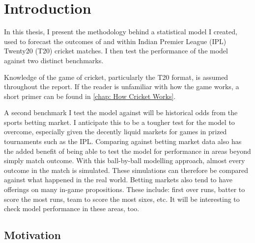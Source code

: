 \newcommand{\hsp}{\hspace{20pt}}
\titleformat{\chapter}[hang]{\Huge\bfseries}{\thechapter\hsp\textcolor{gray75}{|}\hsp}{0pt}{\Huge\bfseries}
\chapter{Introduction}


In this thesis, I present the methodology behind a statistical model I created, used to forecast the outcomes of and within\footnotemark{} Indian Premier League (IPL) Twenty20 (T20) cricket matches. I then test the performance of the model against two distinct benchmarks.


Knowledge of the game of cricket, particularly the T20 format, is assumed throughout the report. If the reader is unfamiliar with how the game works, a short primer can be found in \cref{chap: How Cricket Works}.

A second benchmark I test the model against will be historical odds from the sports betting market. I anticipate this to be a tougher test for the model to overcome, especially given the decently liquid markets\footnotemark{} for games in prized tournaments such as the IPL. Comparing against betting market data also has the added benefit of being able to test the model for performance in areas beyond simply match outcome. With this ball-by-ball modelling approach, almost every outcome in the match is simulated. These simulations can therefore be compared against what happened in the real world. Betting markets also tend to have offerings on many in-game propositions. These include: first over runs, batter to score the most runs, team to score the most sixes, etc. It will be interesting to check model performance in these areas, too.


\section{Motivation}

